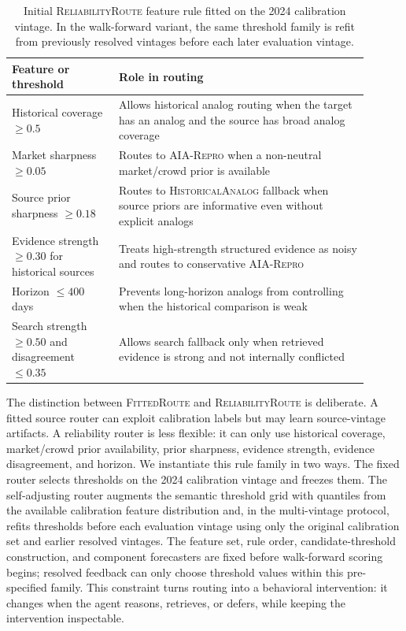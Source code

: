 \documentclass{article}
\newcommand{\rel}{\textsc{ReliabilityRoute}}
\newcommand{\fitroute}{\textsc{FittedRoute}}
\newcommand{\hist}{\textsc{HistoricalAnalog}}
\newcommand{\aialocal}{\textsc{AIA-Repro}}
\begin{document}
\begin{table}[t]
\centering
\caption{Initial \rel{} feature rule fitted on the 2024 calibration vintage. In the walk-forward variant, the same threshold family is refit from previously resolved vintages before each later evaluation vintage.}
\label{tab:reliability}
\begin{tabular}{@{}p{0.27\linewidth}p{0.63\linewidth}@{}}
\toprule
Feature or threshold & Role in routing \\
\midrule
Historical coverage $\ge 0.5$ & Allows historical analog routing when the target has an analog and the source has broad analog coverage \\
Market sharpness $\ge 0.05$ & Routes to \aialocal{} when a non-neutral market/crowd prior is available \\
Source prior sharpness $\ge 0.18$ & Routes to \hist{} fallback when source priors are informative even without explicit analogs \\
Evidence strength $\ge 0.30$ for historical sources & Treats high-strength structured evidence as noisy and routes to conservative \aialocal{} \\
Horizon $\le 400$ days & Prevents long-horizon analogs from controlling when the historical comparison is weak \\
Search strength $\ge 0.50$ and disagreement $\le 0.35$ & Allows search fallback only when retrieved evidence is strong and not internally conflicted \\
\bottomrule
\end{tabular}
\end{table}

The distinction between \fitroute{} and \rel{} is deliberate. A fitted source router can exploit calibration labels but may learn source-vintage artifacts. A reliability router is less flexible: it can only use historical coverage, market/crowd prior availability, prior sharpness, evidence strength, evidence disagreement, and horizon. We instantiate this rule family in two ways. The fixed router selects thresholds on the 2024 calibration vintage and freezes them. The self-adjusting router augments the semantic threshold grid with quantiles from the available calibration feature distribution and, in the multi-vintage protocol, refits thresholds before each evaluation vintage using only the original calibration set and earlier resolved vintages. The feature set, rule order, candidate-threshold construction, and component forecasters are fixed before walk-forward scoring begins; resolved feedback can only choose threshold values within this pre-specified family. This constraint turns routing into a behavioral intervention: it changes when the agent reasons, retrieves, or defers, while keeping the intervention inspectable.
\end{document}
